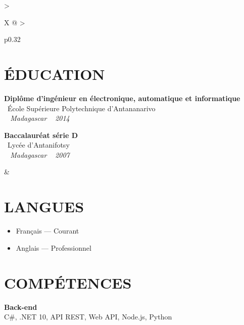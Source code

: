 \documentclass[10pt,a4paper]{article}
\begin{document}
\vspace{14pt}

\setlength{\tabcolsep}{0pt}
\begin{tabularx}{\textwidth}{
  >{\raggedright\arraybackslash}X
  @{\hspace{1cm}}
  >{\raggedright\arraybackslash}p{0.32\textwidth}
}
\begin{minipage}[t]{\linewidth}
\section*{ÉDUCATION}

\textbf{Diplôme d'ingénieur en électronique, automatique et informatique}\\
\textcolor{primary}{ \faGraduationCap\ École Supérieure Polytechnique d'Antananarivo}\\
\textit{ \small \textcolor{darkgray}{ \faMapMarker\ } Madagascar } \hfill  \textit{ \small \textcolor{darkgray}{ \faCalendar\ } 2014 }

\vspace{6pt}

\textbf{Baccalauréat série D}\\
\textcolor{primary}{ \faGraduationCap\ Lycée d'Antanifotsy}\\
\textit{ \small \textcolor{darkgray}{ \faMapMarker\ } Madagascar } \hfill  \textit{ \small \textcolor{darkgray}{ \faCalendar\ } 2007 }
\end{minipage}
&
\begin{minipage}[t]{\linewidth}

\section*{LANGUES}

\begin{itemize}
  \item Français --- Courant
  \item Anglais --- Professionnel
\end{itemize}

\section*{COMPÉTENCES}

\textbf{\color{primary} Back-end}\\
\color{darkgray} C\#, .NET 10, API REST, Web API, Node.js, Python


\end{minipage}
\end{tabularx}
\end{document}
